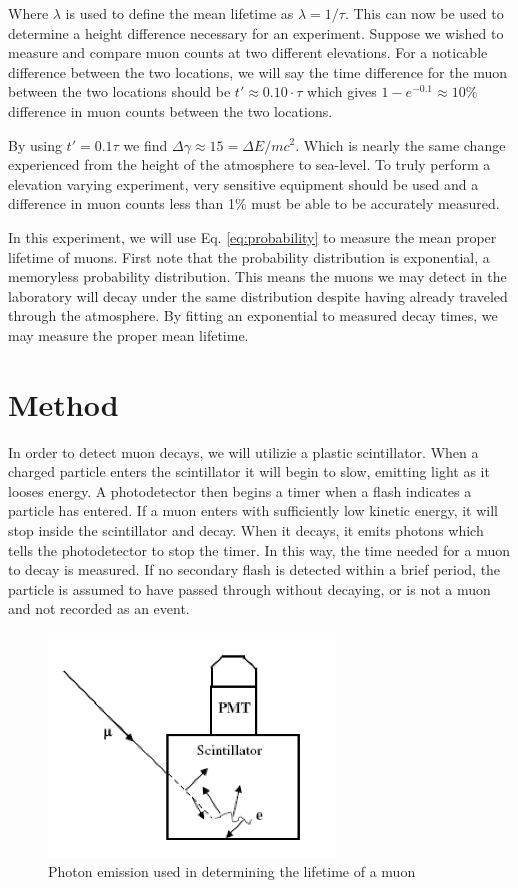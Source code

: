 \documentclass[12pt,twocolumn]{article}
\begin{document}
 Where $\lambda$ is used to define the mean lifetime as $\lambda=1/\tau$.  This can 
 now be used to determine a height difference necessary for an experiment. Suppose we wished to measure and
 compare muon counts at two different elevations. For a noticable difference between the two locations, we will say
 the time difference for the muon between the two locations should be $t'\approx 0.10\cdot\tau$ which gives $1-e^{-0.1}\approx10\%$
difference in muon counts between the two locations.

By using $t'=0.1\tau$ we find $\Delta\gamma\approx15=\Delta E / mc^2$. Which is nearly the same change experienced from
the height of the atmosphere to sea-level. To truly perform a elevation varying experiment, very sensitive equipment should
be used and a difference in muon counts less than 1\% must be able to be accurately measured.

In this experiment, we will use Eq. \ref{eq:probability} to measure the mean proper lifetime of muons. First note that
the probability distribution is exponential, a memoryless probability distribution. This means the muons we may detect
in the laboratory will decay under the same distribution despite having already traveled through the atmosphere. By
fitting an exponential to measured decay times, we may measure the proper mean lifetime.

\section{Method}

In order to detect muon decays, we will utilizie a plastic scintillator. When a charged particle enters the scintillator
it will begin to slow, emitting light as it looses energy. A photodetector then begins a timer when a flash indicates
a particle has entered. If a muon enters with sufficiently low kinetic energy, it will stop inside the scintillator and
decay. When it decays, it emits photons which tells the photodetector to stop the timer. In this way, the time needed
for a muon to decay is measured. If no secondary flash is detected within a brief period, the particle is assumed
to have passed through without decaying, or is not a muon and not recorded as an event.

\begin{figure}[h!]
	\centering
	\label{fig:scin}
	\includegraphics[width=3in]{images/scintillatorevents}
	\caption{Photon emission used in determining the lifetime of a muon}
\end{figure}
\end{document}

